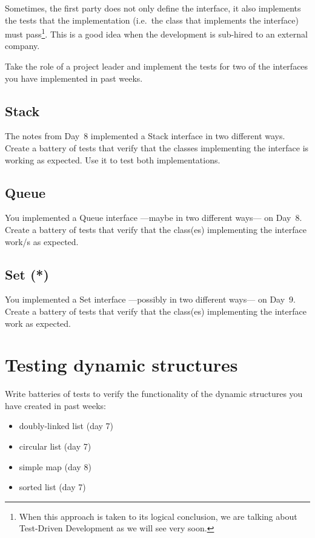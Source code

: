 \documentclass{article}
\begin{document}
Sometimes, the first party does not only define the interface, it also
implements the tests that the implementation (i.e.~the class that
implements the interface) must pass\footnote{When this approach is taken to
its logical conclusion, we are talking about Test-Driven Development
as we will see very soon.}. This is a good idea when the development is
sub-hired to an external company. 

Take the role of a project leader and implement the tests for two of
the interfaces you have implemented in past weeks. 

\subsection{Stack}
\label{sec:stack3}

The notes from Day~8 implemented a Stack interface in two different
ways. Create a battery of tests that verify that the classes
implementing the interface is working as expected. Use it to test both
implementations.

\subsection{Queue}
\label{sec:stack2}

You implemented a Queue interface ---maybe in two different ways--- on
Day~8. Create a battery of tests that verify that the class(es)
implementing the interface work/s as expected. 

\subsection{Set (*)}
\label{sec:stack5}

You implemented a Set interface ---possibly in two different ways--- on
Day~9. Create a battery of tests that verify that the class(es)
implementing the interface work as expected. 


\section{Testing dynamic structures}
\label{sec:testing-maps}

Write batteries of tests to verify the functionality of the dynamic
structures you have created in past weeks: 


\begin{itemize}
\item doubly-linked list (day 7)
\item circular list (day 7)
\item simple map (day 8)
\item sorted list (day 7)
\end{itemize}
\end{document}
